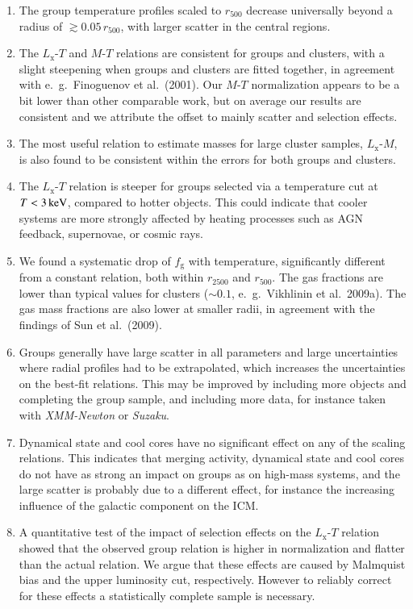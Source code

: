 \documentclass[structabstract]{aa}
\begin{document}
\begin{enumerate}
\item The group temperature profiles scaled to $r_{500}$ decrease universally
  beyond a radius of $\gtrsim0.05\,r_{500}$, with larger scatter in the
  central regions.
\item The $L_{\text{x}}$-$T$ and $M$-$T$ relations are consistent
  for groups and clusters, with a slight steepening when groups and
  clusters are fitted together, in agreement with e.\ g.\ Finoguenov
  et al.\ (2001). Our $M$-$T$ normalization appears to be a bit lower
  than other comparable work, but on average our results are
  consistent and we attribute the offset to mainly scatter and selection effects.
\item The most useful relation to estimate masses for large cluster
  samples, $L_{\text{x}}$-$M$, is also found to be consistent within
  the errors for both groups and clusters.
\item The $L_{\text{x}}$-$T$ relation is steeper for groups selected
  via a temperature cut at $T<\unit[3]{keV}$, compared to hotter
  objects. This could indicate that cooler systems are more strongly
  affected by heating processes such as AGN feedback, supernovae, or
  cosmic rays.
\item We found a systematic drop of $f_{\text{g}}$ with temperature,
  significantly different from a constant relation, both within $r_{2500}$ and
  $r_{500}$. The gas fractions are lower than typical values for
  clusters ($\sim 0.1$, e.\ g.\ Vikhlinin et al.\ 2009a). The gas
  mass fractions are also lower at smaller radii, in agreement with
  the findings of Sun et al.\ (2009).
\item Groups generally have large scatter in all parameters and large
  uncertainties where radial profiles had to be extrapolated, which
  increases the uncertainties on the best-fit relations. This may be
  improved by including more objects and completing the group sample,
  and including more data, for instance taken with \emph{XMM-Newton}
  or \emph{Suzaku}. 
\item Dynamical state and cool cores have no significant effect
  on any of the scaling relations. This indicates that merging
  activity, dynamical state and cool cores do not have as strong
  an impact on groups as on high-mass systems, and the large scatter
  is probably due to a different effect, for instance the
    increasing influence of the galactic component on the ICM.
\item A quantitative test of the impact of selection effects on
    the $L_{\text{x}}$-$T$ relation showed that the observed group
    relation is higher in normalization and flatter than the actual
    relation. We argue that these effects are caused by Malmquist bias
    and the upper luminosity cut, respectively. However to reliably
    correct for these effects a statistically complete sample is
    necessary.
\end{enumerate}
\end{document}
